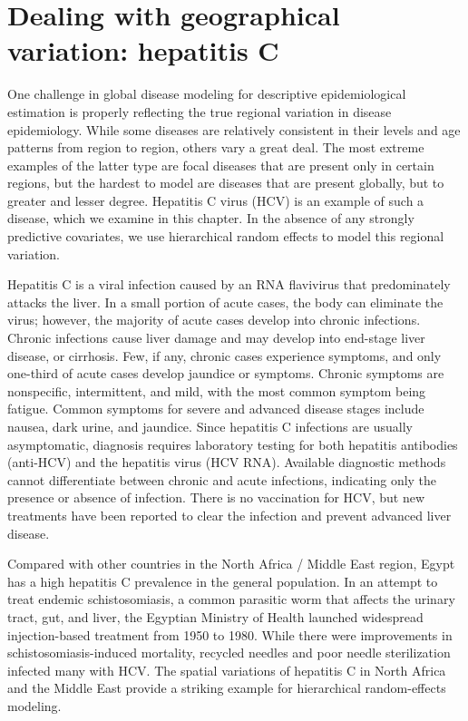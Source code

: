 \chapter{Dealing with geographical variation: hepatitis C}
\label{applications-rfx}

One challenge in global disease modeling for descriptive
epidemiological estimation is properly reflecting the true regional
variation in disease epidemiology. While some diseases are relatively
consistent in their levels and age patterns from region to region,
others vary a great deal.  The most extreme examples of the latter type are focal
diseases that are present only in certain regions, but the hardest to
model are diseases that are present globally, but to greater and lesser
degree.  Hepatitis C virus (HCV) is an example of such a disease,
which we examine in this chapter.  In the absence of any strongly
predictive covariates, we use hierarchical random effects to model
this regional variation.

Hepatitis C is a viral infection caused by an RNA flavivirus that
predominately attacks the liver.  In a small
portion of acute cases, the body can eliminate the virus; however, the
majority of acute cases develop into chronic infections.  Chronic
infections cause liver damage and may develop into end-stage liver
disease, or cirrhosis.  Few, if any, chronic cases experience symptoms,
and only one-third of acute cases develop jaundice or symptoms.
Chronic symptoms are nonspecific, intermittent, and mild, with the most
common symptom being fatigue.  Common symptoms for severe and advanced
disease stages include nausea, dark urine, and jaundice.  Since
hepatitis C infections are usually asymptomatic, diagnosis requires laboratory
testing for both hepatitis antibodies (anti-HCV) and the hepatitis
virus (HCV RNA).  Available diagnostic methods cannot differentiate
between chronic and acute infections, indicating only the presence
or absence of infection.  There is no vaccination for HCV, but
new treatments have been reported to clear the infection and
prevent advanced liver disease. \cite{hoofnagle_hepatitis_1997, ghany_diagnosis_2009, ghany_update_2011}

Compared with other countries in the North Africa / Middle East region,
Egypt has a high hepatitis C prevalence in the general population.  In an attempt to treat
endemic schistosomiasis, a common parasitic worm that affects the
urinary tract, gut, and liver, the Egyptian Ministry of Health launched
widespread injection-based treatment from 1950 to 1980.  While
there were improvements in schistosomiasis-induced mortality, recycled
needles and poor needle sterilization infected many with HCV.
\cite{frank_role_2000, mezban_hepatitis_2006, strickland_liver_2006}
The spatial variations of hepatitis C in
North Africa and the Middle East provide a striking example for
hierarchical random-effects modeling.

